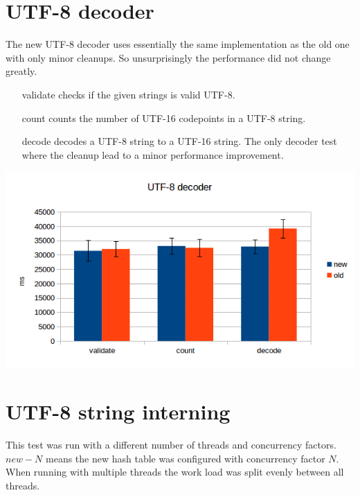 \documentclass[12pt,a4paper,oneside]{article}
\begin{document}
\section{UTF-8 decoder}
	The new UTF-8 decoder uses essentially the same implementation as the old one with only minor cleanups.
	So unsurprisingly the performance did not change greatly.

	\begin{itemize}
		\item[validate] checks if the given strings is valid UTF-8.
		\item[count]    counts the number of UTF-16 codepoints in a UTF-8 string.
		\item[decode]   decodes a UTF-8 string to a UTF-16 string.
		                The only decoder test where the cleanup lead to a minor performance improvement.
	\end{itemize}

	\includegraphics{utf8-decoder.png}

\section{UTF-8 string interning}
	This test was run with a different number of threads and concurrency factors.
	$new-N$ means the new hash table was configured with concurrency factor $N$.
	When running with multiple threads the work load was split evenly between all threads.
\end{document}
